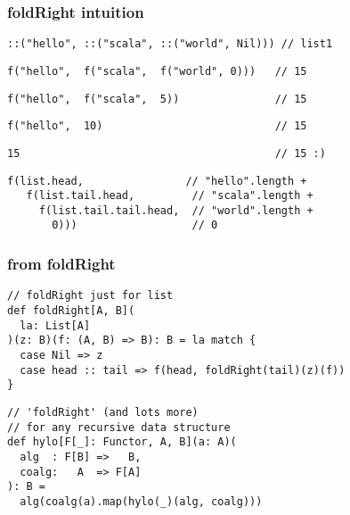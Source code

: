 \documentclass[include/preamble.tex]{subfiles}
\begin{document}
\begin{frame}[fragile]
  \frametitle{foldRight intuition}
  \begin{center}
    \lstset{aboveskip=0pt,belowskip=0pt}
    \begin{lstlisting}[style=scala]
::("hello", ::("scala", ::("world", Nil))) // list1
    \end{lstlisting}
    \pause
    \vspace{1em}
    \begin{lstlisting}[style=scala]
 f("hello",  f("scala",  f("world", 0)))   // 15
    \end{lstlisting}
    \pause
    \begin{lstlisting}[style=scala]
 f("hello",  f("scala",  5))               // 15
    \end{lstlisting}
    \pause
    \begin{lstlisting}[style=scala]
 f("hello",  10)                           // 15
    \end{lstlisting}
    \pause
    \begin{lstlisting}[style=scala]
 15                                        // 15 :)
    \end{lstlisting}
    \pause
    \vspace{1em}
    \begin{lstlisting}[style=scala]
 f(list.head,                // "hello".length +
   f(list.tail.head,         // "scala".length +
     f(list.tail.tail.head,  // "world".length +
       0)))                  // 0
    \end{lstlisting}
  \end{center}
\end{frame}

\begin{frame}[fragile]
  \frametitle{from foldRight }
  \begin{center}
    \begin{lstlisting}[style=scala]
// foldRight just for list
def foldRight[A, B](
  la: List[A]
)(z: B)(f: (A, B) => B): B = la match {
  case Nil => z
  case head :: tail => f(head, foldRight(tail)(z)(f))
}
    \end{lstlisting}
    \pause
    \hrulefill
    \begin{lstlisting}[style=scala]
// 'foldRight' (and lots more)
// for any recursive data structure
def hylo[F[_]: Functor, A, B](a: A)(
  alg  : F[B] =>   B,
  coalg:   A  => F[A]
): B =
  alg(coalg(a).map(hylo(_)(alg, coalg)))
    \end{lstlisting}
  \end{center}
\end{frame}
\end{document}
